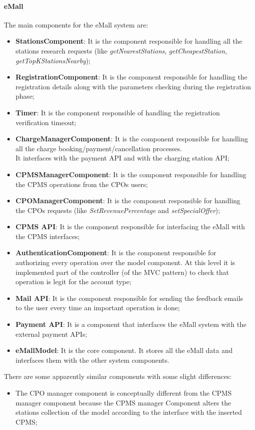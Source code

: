 \paragraph{\textbf{\ac{eMall}}}
The main components for the \ac{eMall} system are:
\begin{itemize}
    \item \textbf{StationsComponent}: It is the component responsible for handling all the stations research requests (like \textit{getNearestStations}, \textit{getCheapestStation}, \textit{getTopKStationsNearby});
    \item \textbf{RegistrationComponent}: It is the component responsible for handling the registration details along with the parameters checking during the registration phase;
    \item \textbf{Timer}: It is the component responsible of handling the registration verification timeout;
    \item \textbf{ChargeManagerComponent}: It is the component responsible for handling all the charge booking/payment/cancellation processes. \\ It interfaces with the payment \ac{API} and with the charging station \ac{API};
    \item \textbf{\ac{CPMS}ManagerComponent}: It is the component responsible for handling the \ac{CPMS} operations from the \acp{CPO} users;
    \item \textbf{\ac{CPO}ManagerComponent}: It is the component responsible for handling the \acp{CPO} requests (like \textit{SetRevenuePercentage} and \textit{setSpecialOffer});
    \item \textbf{\ac{CPMS} \ac{API}}: It is the component responsible for interfacing the \ac{eMall} with the CPMS interfaces;
    \item \textbf{AuthenticationComponent}: It is the component responsible for authorizing every operation over the model component. At this level it is implemented part of the controller (of the \ac{MVC} pattern) to check that operation is legit for the account type;
    \item \textbf{Mail \ac{API}}: It is the component responsible for sending the feedback emails to the user every time an important operation is done;
    \item \textbf{Payment \ac{API}}: It is a component that interfaces the \ac{eMall} system with the external payment \acp{API};
    \item \textbf{\ac{eMall}Model}: It is the core component. It stores all the \ac{eMall} data and interfaces them with the other system components.
\end{itemize}
There are some apparently similar components with some slight differences:
\begin{itemize}
    \item The \ac{CPO} manager component is conceptually different from the \ac{CPMS} manager component because the CPMS manager Component alters the stations collection of the model according to the interface with the inserted \ac{CPMS};
\end{itemize}
